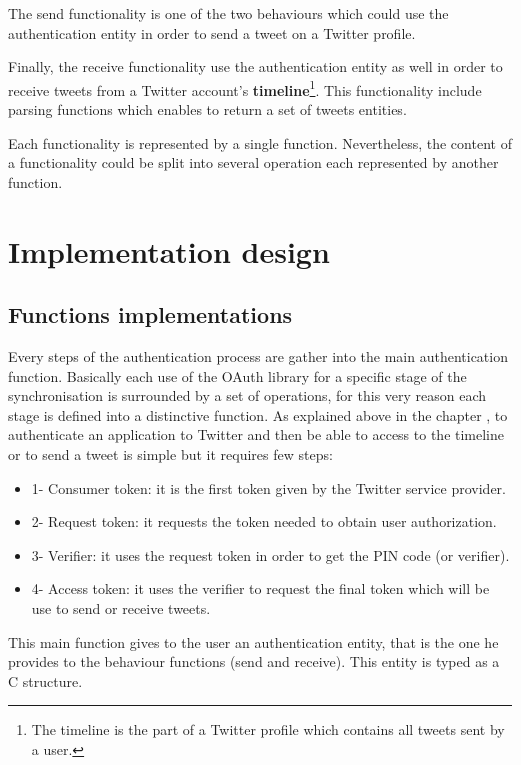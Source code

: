 The send functionality is one of the two behaviours which could use the authentication entity in order to send a tweet on a Twitter profile.

Finally, the receive functionality use the authentication entity as well in order to receive tweets from a Twitter account's \textbf{timeline}\footnote{The timeline is the part of a Twitter profile which contains all tweets sent by a user.}. This functionality include parsing functions which enables to return a set of tweets entities. 

Each functionality is represented by a single function. Nevertheless, the content of a functionality could be split into several operation each represented by another function.



\section{Implementation design}


\subsection{Functions implementations}


\hspace{15mm}Every steps of the authentication process are gather into the main authentication function. Basically each use of the OAuth library for a specific stage of the synchronisation is surrounded by a set of operations, for this very reason each stage is defined into a distinctive function. As explained above in the chapter , to authenticate an application to Twitter and then be able to access to the timeline or to send a tweet is simple but it requires few steps:
\begin{itemize}
\item 1- Consumer token: it is the first token given by the Twitter service provider.
\item 2- Request token: it requests the token needed to obtain user authorization.
\item 3- Verifier: it uses the request token in order to get the PIN code (or verifier). 
\item 4- Access token: it uses the verifier to request the final token which will be use to send or receive tweets.
\end{itemize}
This main function gives to the user an authentication entity, that is the one he provides to the behaviour functions (send and receive). This entity is typed as a C structure.

